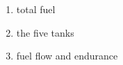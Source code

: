 \begin{enumerate}[label=\textbf{\arabic*},leftmargin=*,itemsep=0pt]
\item total fuel
\item the five tanks
\item fuel flow and endurance
\end{enumerate}
